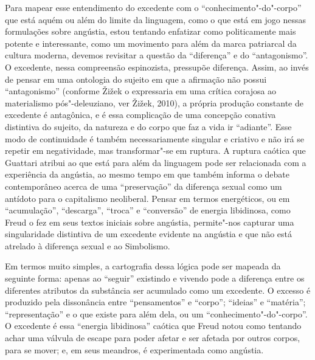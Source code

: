 Para mapear esse entendimento do excedente com o
``conhecimento"-do"-corpo'' que está aquém ou além do limite da linguagem,
como o que está em jogo nessas formulações sobre angústia, estou
tentando enfatizar como politicamente mais potente e interessante, como
um movimento para além da marca patriarcal da cultura moderna, devemos
revisitar a questão da ``diferença'' e do ``antagonismo''. O excedente,
nessa compreensão espinozista, pressupõe diferença. Assim, ao invés de
pensar em uma ontologia do sujeito em que a afirmação não possui
``antagonismo'' (conforme Žižek o expressaria em uma crítica corajosa ao
materialismo pós"-deleuziano, ver Žižek, 2010), a própria produção
constante de excedente é antagônica, e é essa complicação de uma
concepção conativa distintiva do sujeito, da natureza e do corpo que faz
a vida ir ``adiante''. Esse modo de continuidade é também
necessariamente singular e criativo e não irá se repetir em
negatividade, mas transformar"-se em ruptura. A ruptura caótica que
Guattari atribui ao que está para além da linguagem pode ser relacionada
com a experiência da angústia, ao mesmo tempo em que também informa o
debate contemporâneo acerca de uma ``preservação'' da diferença sexual
como um antídoto para o capitalismo neoliberal. Pensar em termos
energéticos, ou em ``acumulação'', ``descarga'', ``troca'' e
``conversão'' de energia libidinosa, como Freud o fez em seus textos
iniciais sobre angústia, permite"-nos capturar uma singularidade
distintiva de um excedente evidente na angústia e que não está atrelado
à diferença sexual e ao Simbolismo.

Em termos muito simples, a cartografia dessa lógica pode ser mapeada da
seguinte forma: apenas ao ``seguir'' existindo e vivendo pode a
diferença entre os diferentes atributos da substância ser acumulado como
um excedente. O excesso é produzido pela dissonância entre
``pensamentos'' e ``corpo''; ``ideias'' e ``matéria''; ``representação''
e o que existe para além dela, ou um ``conhecimento"-do"-corpo''. O
excedente é essa ``energia libidinosa'' caótica que Freud notou como
tentando achar uma válvula de escape para poder afetar e ser afetada por
outros corpos, para se mover; e, em seus meandros, é experimentada como
angústia.

